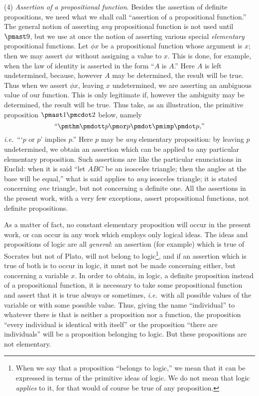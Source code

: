 (4) \textit{Assertion of a propositional function}. Besides the assertion of definite propositions, we need what we shall call ``assertion of a propositional function.'' The general notion of asserting \textit{any} propositional function is not used until $\pmast9$, but we use at once the notion of asserting various special \textit{elementary} propositional functions. Let $\phi x$ be a propositional function whose argument is $x$; then we may assert $\phi x$ without assigning a value to $x$.  This is done, for example, when the law of identity is asserted in the form ``$A$ is $A$.'' Here $A$ is left undetermined, because, however $A$ may be  determined, the result will be true. Thus when we assert $\phi x$, leaving $x$ undetermined, we are asserting an ambiguous value of our function. This is only legitimate if, however the ambiguity may be determined, the result will be true. Thus take, as an illustration, the primitive proposition $\pmast1\pmcdot2$ below, namely
\[
\text{``} \pmthm \pmdott p \pmor p \pmdot \pmimp \pmdot p\text{,''}
\]
\textit{i.e.}\ ```$p$ or $p$' implies $p$.'' Here $p$ may be \textit{any} elementary proposition: by leaving $p$ undetermined, we obtain an assertion which can be applied to any particular elementary proposition. Such assertions are like the particular enunciations in Euclid: when it is said ``let $ABC$ be an isosceles triangle; then the angles at the base will be equal,'' what is said applies to \textit{any} isosceles triangle; it is stated concerning \textit{one} triangle, but not concerning a definite one. All the assertions in the present work, with a very few exceptions, assert propositional functions, not definite propositions.

As a matter of fact, no constant elementary proposition will occur in the present work, or can occur in any work which employs only logical ideas. The ideas and propositions of logic are all \textit{general}: an assertion (for example) which is true of Socrates but not of Plato, will not belong to logic\footnote{When we say that a proposition ``belongs to logic,'' we mean that it can be expressed in terms of the primitive ideas of logic. We do not mean that logic \textit{applies} to it, for that would of course be true of any proposition.}, and if an assertion which is true of both is to occur in logic, it must not be made concerning either, but concerning a variable $x$. In order to obtain, in logic, a definite proposition instead of a propositional function, it is necessary to take some propositional function and assert that it is true always or sometimes, \textit{i.e.}\ with all possible values of the variable or with some possible value. Thus, giving the name ``individual'' to whatever there is that is neither a proposition nor a function, the proposition ``every individual is identical with itself'' or the proposition ``there are individuals'' will be a proposition belonging to logic. But these propositions are not elementary.

